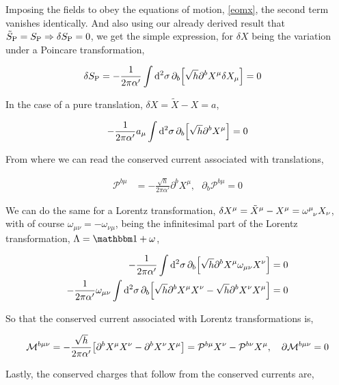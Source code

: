 Imposing the fields to obey the equations of motion, \ref{eomx}, the second term vanishes identically. And also using our 
already derived result that $\tilde S_{\textnormal{P}}=S_{\textnormal{P}}\Rightarrow\delta S_{\textnormal{P}}=0$, we get the simple 
expression, for $\delta X$ being the variation under a Poincare transformation,

\begin{align*}
    \delta S_{\textnormal{P}}&=-\frac{1}{2\pi\alpha'}\int\dd[2]{\sigma}\partial_b\qty[\sqrt{h}\partial^bX^\mu\delta X_\mu]=0
\end{align*}

In the case of a pure translation, $\delta X=\tilde X-X=a$,

\begin{align*}
    -\frac{1}{2\pi\alpha'}a_\mu\int\dd[2]{\sigma}\partial_b\qty[\sqrt{h}\partial^bX^\mu]=0
\end{align*}

From where we can read the conserved current associated with translations,

\begin{align*}
    \mathcal P^{b\mu}&=-\frac{\sqrt{h}}{2\pi\alpha'}\partial^bX^\mu,\ \ \ \partial_b\mathcal P^{b\mu}=0
\end{align*}

We can do the same for a Lorentz transformation, $\delta X^\mu=\tilde X^\mu-X^\mu=\tensor{\omega}{^\mu_\nu}X_\nu$, with of course $\omega_{\mu\nu}=-\omega_{\nu\mu}$, 
being the infinitesimal part of the Lorentz transformation, $\Lambda=\mathbbm 1+\omega$,

\begin{align*}
    -\frac{1}{2\pi\alpha'}\int\dd[2]{\sigma}\partial_b\qty[\sqrt{h}\partial^bX^\mu\omega_{\mu\nu}X^\nu]&=0\\
    -\frac{1}{2\pi\alpha'}\omega_{\mu\nu}\int\dd[2]{\sigma}\partial_b\qty[\sqrt{h}\partial^bX^\mu X^\nu-\sqrt{h}\partial^bX^\nu X^\mu]&=0
\end{align*}

So that the conserved current associated with Lorentz transformations is,

\begin{align*}
    \mathcal M^{b\mu\nu}=-\frac{\sqrt{h}}{2\pi\alpha'}\qty[\partial^b X^\mu X^\nu-\partial^b X^\nu X^\mu]=\mathcal P^{b\mu}X^\nu-\mathcal P^{b\nu}X^\mu,\ \ \ \partial\mathcal M^{b\mu\nu}=0
\end{align*}

Lastly, the conserved charges that follow from the conserved currents are,

